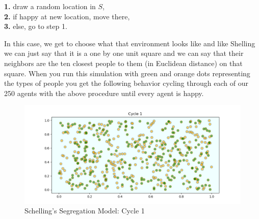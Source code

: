 \documentclass[12pt,twoside]{reedthesis}
\begin{document}
\begin{adjustwidth}{1cm}{}
	\textbf{1.} draw a random location in $S$, \\
	\textbf{2.} if happy at new location, move there,\\
	\textbf{3.} else, go to step 1.
\end{adjustwidth}

In this case, we get to choose what that environment looks like and like Shelling we can just say that it is a one by one unit square and we can say that their neighbors are the ten closest people to them (in Euclidean distance) on that square. When you run this simulation with green and orange dots representing the types of people you get the following behavior cycling through each of our 250 agents with the above procedure until every agent is happy. 

\begin{figure}[h!]
	\centering
	\includegraphics[scale=0.5]{Figures/segregation_1}
	\caption{Schelling's Segregation Model: Cycle 1}
	\label{SSM1_ch1}
\end{figure}
\end{document}
